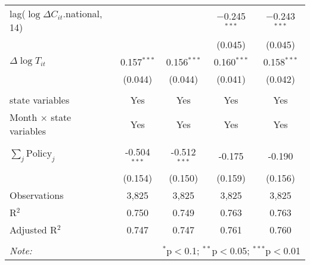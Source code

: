 \begin{tabular}{@{\extracolsep{1pt}}lcccc}
  lag($\log \Delta C_{it}$.national, 14) &  &  & $-$0.245$^{***}$ & $-$0.243$^{***}$ \\ 
  &  &  & (0.045) & (0.045) \\ 
  $\Delta \log T_{it}$ & 0.157$^{***}$ & 0.156$^{***}$ & 0.160$^{***}$ & 0.158$^{***}$ \\ 
  & (0.044) & (0.044) & (0.041) & (0.042) \\ 
 \hline \\[-1.8ex] 
state variables & Yes & Yes & Yes & Yes \\ 
Month $\times$ state variables & Yes & Yes & Yes & Yes \\ 
\hline \\[-1.8ex] 
$\sum_j \mathrm{Policy}_j$ & -0.504$^{***}$ & -0.512$^{***}$ & -0.175 & -0.190 \\ 
 & (0.154) & (0.150) & (0.159) & (0.156) \\ 
Observations & 3,825 & 3,825 & 3,825 & 3,825 \\ 
R$^{2}$ & 0.750 & 0.749 & 0.763 & 0.763 \\ 
Adjusted R$^{2}$ & 0.747 & 0.747 & 0.761 & 0.760 \\ 
\hline 
\hline \\[-1.8ex] 
\textit{Note:}  & \multicolumn{4}{r}{$^{*}$p$<$0.1; $^{**}$p$<$0.05; $^{***}$p$<$0.01} \\ 
\end{tabular} 